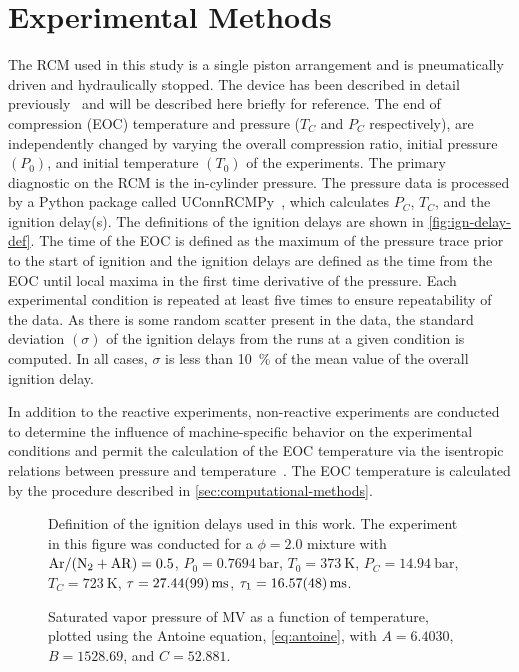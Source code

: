 \documentclass[12pt]{../ussci}
\begin{document}
\section{Experimental Methods}\label{sec:experimental-methods}

The RCM used in this study is a single piston arrangement and is pneumatically
driven and hydraulically stopped. The device has been described in detail
previously~\autocite{Mittal2007a} and will be described here briefly for
reference. The end of compression (EOC) temperature and pressure (\(T_C\) and
\(P_C\) respectively), are independently changed by varying the overall
compression ratio, initial pressure \((P_0)\), and initial temperature \((T_0)\)
of the experiments. The primary diagnostic on the RCM is the in-cylinder
pressure. The pressure data is processed by a Python package called UConnRCMPy~\autocite{uconnrcmpy}, which calculates \(P_C\), \(T_C\), and the ignition
delay(s). The definitions of the ignition delays are shown in
\cref{fig:ign-delay-def}. The time of the EOC is defined as the maximum of the
pressure trace prior to the start of ignition and the ignition delays are
defined as the time from the EOC until local maxima in the first time derivative
of the pressure. Each experimental condition is repeated at least five times to
ensure repeatability of the data. As there is some random scatter present in the
data, the standard deviation \((\sigma)\) of the ignition delays from the runs
at a given condition is computed. In all cases, \(\sigma\) is less than
\SI{10}{\percent} of the mean value of the overall ignition delay.

In addition to the reactive experiments, non-reactive experiments are conducted
to determine the influence of machine-specific behavior on the experimental
conditions and permit the calculation of the EOC temperature via the isentropic
relations between pressure and temperature~\autocite{Lee1998}. The EOC
temperature is calculated by the procedure described in
\cref{sec:computational-methods}.

\begin{figure}[htb]
    \begin{minipage}[t]{0.48\textwidth}
        \centering
        \resizebox{\linewidth}{!}{}
        \caption{Definition of the ignition delays used in this work. The
        experiment in this figure was conducted for a \(\phi=2.0\) mixture with
        \mbox{\(\ce{Ar}/(\ce{N2}+\ce{AR})=0.5\)}, \(P_0=\SI{0.7694}{\bar}\),
        \(T_0=\SI{373}{\K}\), \(P_C=\SI{14.94}{\bar}\), \(T_C=\SI{723}{\K}\),
        \(\tau=\SI{27.44\pm0.99}{\ms}\), \(\tau_1=\SI{16.57\pm0.48}{\ms}\).}
        \label{fig:ign-delay-def}
    \end{minipage}\hfill%
    \begin{minipage}[t]{0.48\textwidth}
        \centering
        \resizebox{\linewidth}{!}{}
        \caption{Saturated vapor pressure of MV as a function of temperature,
        plotted using the Antoine equation, \cref{eq:antoine}, with
        \(A=6.4030\), \(B=1528.69\), and \(C=52.881\).}
        \label{fig:vapor-pressure}
    \end{minipage}
\end{figure}
\end{document}
